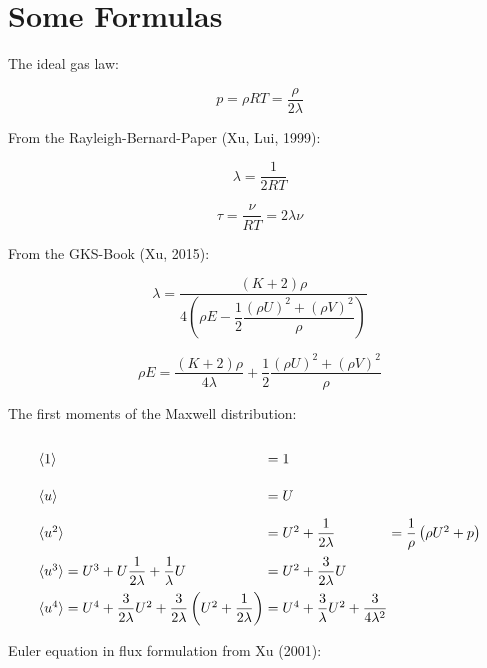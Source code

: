 \documentclass[
	pdftex,             %
	12pt,				%
	a4paper,		   	%
	english,				%
	oneside,			%
]{article}
\newcommand{\mom}[1]{\langle #1 \rangle}
\begin{document}
\clearpage

\section{Some Formulas}

The ideal gas law:

\begin{equation}
p = \rho RT = \dfrac{\rho}{2 \lambda}
\end{equation}

From the Rayleigh-Bernard-Paper (Xu, Lui, 1999):

\begin{equation}
\lambda = \frac{1}{2RT}
\end{equation}

\begin{equation}
\tau = \frac{\nu}{RT} = 2\lambda\nu
\end{equation}

From the GKS-Book (Xu, 2015):

\begin{equation}
\lambda =\frac{(K+2)\rho}
{4\left( \rho E - \dfrac{1}{2} \dfrac{(\rho U)^2 + (\rho V)^2}{\rho}  \right)}
\end{equation}

\begin{equation}
\rho E = \dfrac{(K+2)\rho}{4\lambda} + \dfrac{1}{2} \dfrac{(\rho U)^2 + (\rho V)^2}{\rho}
\end{equation}

The first moments of the Maxwell distribution:

\begin{equation}
\arraycolsep=1.4pt\def\arraystretch{2.2}
\begin{array}{lcll}
\mom{1} &=& 1 &\\
\mom{u} &=& U &\\
\mom{u^2} &=& U^2 + \dfrac{1}{2\lambda} & = \dfrac{1}{\rho} \left( \rho U^2 + p \right) \\
\mom{u^3} = U^3 + U\dfrac{1}{2\lambda} + \dfrac{1}{\lambda} U &=& U^2 + \dfrac{3}{2\lambda} U &\\
\mom{u^4} = U^4 + \dfrac{3}{2\lambda} U^2 + \dfrac{3}{2\lambda} \left(U^2 + \dfrac{1}{2\lambda} \right)
		  &=& U^4 + \dfrac{3}{\lambda} U^2 + \dfrac{3}{4\lambda^2}&
\end{array}
\end{equation}

Euler equation in flux formulation from Xu (2001):
\end{document}

